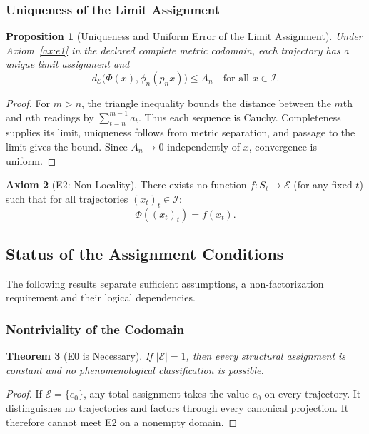 \documentclass[11pt,a4paper]{article}
\theoremstyle{plain}
\newtheorem{theorem}{Theorem}[section]
\newtheorem{proposition}[theorem]{Proposition}
\theoremstyle{definition}
\newtheorem{axiom}[theorem]{Axiom}
\theoremstyle{remark}
\begin{document}
\subsubsection{Uniqueness of the Limit Assignment}

\begin{proposition}[Uniqueness and Uniform Error of the Limit Assignment]\label{prop:unique-phi}
Under Axiom~\ref{ax:e1} in the declared complete metric codomain, each trajectory has a unique limit assignment and
\[
d_{\mathcal E}\bigl(\Phi(x),\phi_n(p_nx)\bigr)\leq A_n
\quad\text{for all }x\in\mathcal I.
\]
\end{proposition}

\begin{proof}
For $m>n$, the triangle inequality bounds the distance between the $m$th and $n$th readings by $\sum_{t=n}^{m-1}a_t$. Thus each sequence is Cauchy. Completeness supplies its limit, uniqueness follows from metric separation, and passage to the limit gives the bound. Since $A_n\to0$ independently of $x$, convergence is uniform.
\end{proof}

\begin{axiom}[E2: Non-Locality]\label{ax:e2}
There exists no function $f: S_t \to \mathcal{E}$ (for any fixed $t$) such that for all trajectories $(x_t)_t \in \mathcal{I}$:
\begin{equation}
    \Phi((x_t)_t) = f(x_t).
\end{equation}
\end{axiom}

\subsection{Status of the Assignment Conditions}

The following results separate sufficient assumptions, a non-factorization requirement and their logical dependencies.

\subsubsection{Nontriviality of the Codomain}

\begin{theorem}[E0 is Necessary]\label{thm:e0-necessary}
If $|\mathcal{E}| = 1$, then every structural assignment is constant and no phenomenological classification is possible.
\end{theorem}

\begin{proof}
If $\mathcal E=\{e_0\}$, any total assignment takes the value $e_0$ on every trajectory. It distinguishes no trajectories and factors through every canonical projection. It therefore cannot meet E2 on a nonempty domain.
\end{proof}
\end{document}
